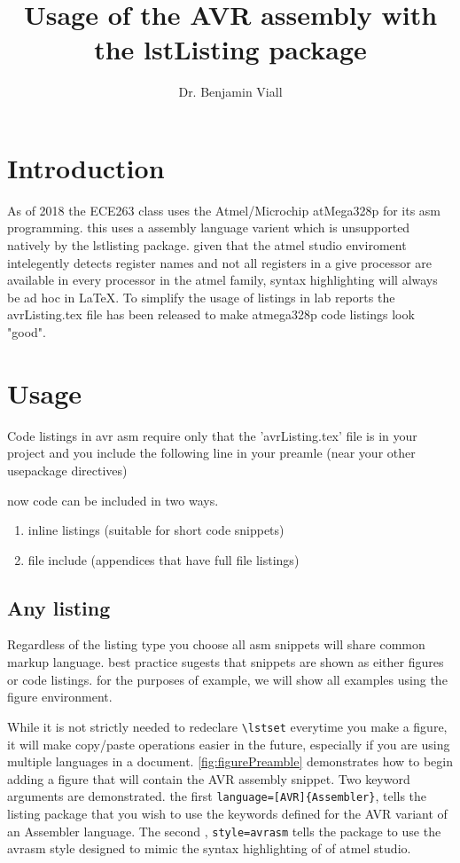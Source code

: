 \documentclass[titlepage]{article}
\begin{document}
\title{Usage of the AVR assembly with the lstListing package}
\author {Dr. Benjamin Viall}


\maketitle

\section{Introduction}
As of 2018 the ECE263 class uses the Atmel/Microchip atMega328p for its asm programming. this uses a assembly language varient which is unsupported natively by the lstlisting package. given that the atmel studio enviroment intelegently detects register names and not all registers in a give processor are available in every processor in the atmel family, syntax highlighting will always be ad hoc in \LaTeX. To simplify the usage of listings in lab reports the avrListing.tex file has been released to make atmega328p code listings look "good".

\section {Usage}
Code listings in avr asm require only that the 'avrListing.tex' file is in your project and you include the following line in your preamle (near your other usepackage directives)

\verb||

now code can be included in two ways. 
\begin{enumerate}
	\item inline listings (suitable for short code snippets)
	\item file include (appendices that have full file listings)
\end{enumerate}

\subsection{Any listing}
 Regardless of the listing type you choose all asm snippets will share common markup language. best practice sugests that snippets are shown as either figures or code listings. for the purposes of example, we will show all examples using the figure environment. 
 
 While it is not strictly needed to redeclare \verb|\lstset| everytime you make a figure, it will make copy/paste operations easier in the future, especially if you are using multiple languages in a document. \cref{fig:figurePreamble} demonstrates how to begin adding a figure that will contain the AVR assembly snippet. Two keyword arguments are demonstrated. the first \verb|language=[AVR]{Assembler}|, tells the listing package that you wish to use the keywords defined for the AVR variant of an Assembler language. The second , \verb|style=avrasm| tells the package to use the avrasm style designed to mimic the syntax highlighting of of atmel studio.
 
\end{document}
